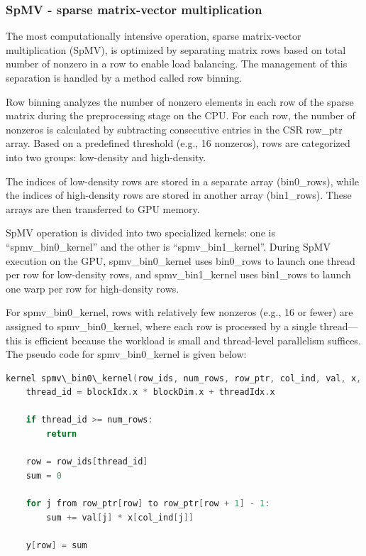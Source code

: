 \documentclass[conference]{IEEEtran}
\begin{document}
\subsubsection{SpMV - sparse matrix-vector multiplication}
The most computationally intensive operation, sparse matrix-vector multiplication (SpMV), is optimized by separating matrix rows based on total number of nonzero in a row to enable load balancing. The management of this separation is handled by a method called row binning.

Row binning analyzes the number of nonzero elements in each row of the sparse matrix during the preprocessing stage on the CPU. For each row, the number of nonzeros is calculated by subtracting consecutive entries in the CSR row\_ptr array. Based on a predefined threshold (e.g., 16 nonzeros), rows are categorized into two groups: low-density and high-density. 

The indices of low-density rows are stored in a separate array (bin0\_rows), while the indices of high-density rows are stored in another array (bin1\_rows). These arrays are then transferred to GPU memory.

SpMV operation is divided into two specialized kernels: one is “spmv\_bin0\_kernel” and the other is “spmv\_bin1\_kernel”. During SpMV execution on the GPU, spmv\_bin0\_kernel uses bin0\_rows to launch one thread per row for low-density rows, and spmv\_bin1\_kernel uses bin1\_rows to launch one warp per row for high-density rows.

For spmv\_bin0\_kernel, rows with relatively few nonzeros (e.g., 16 or fewer) are assigned to spmv\_bin0\_kernel, where each row is processed by a single thread—this is efficient because the workload is small and thread-level parallelism suffices. The pseudo code for spmv\_bin0\_kernel is given below:


\begin{lstlisting}[language=C]
kernel spmv\_bin0\_kernel(row_ids, num_rows, row_ptr, col_ind, val, x, y):
    thread_id = blockIdx.x * blockDim.x + threadIdx.x

    if thread_id >= num_rows:
        return

    row = row_ids[thread_id]
    sum = 0

    for j from row_ptr[row] to row_ptr[row + 1] - 1:
        sum += val[j] * x[col_ind[j]]

    y[row] = sum
\end{lstlisting}
\end{document}
